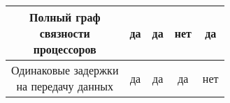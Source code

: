 \begin{table}[!htbp]
\begin{tabular}{c|c|c|c|c}
        \hline
        \makecell{Полный граф                                                                       \\связности\\процессоров}      & да                                         & да     & нет                    & да                     \\
        \hline
        \makecell{Одинаковые задержки                                                               \\на передачу данных} & да                                         & да     & да                     & нет                    \\
    \end{tabular}

\end{table}
